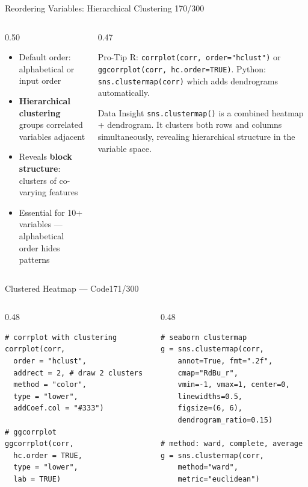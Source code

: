 \documentclass[10pt]{beamer}
\newcommand{\smark}[1]{\hfill{\scriptsize\color{codegray}#1}}
\begin{document}
\begin{frame}{Reordering Variables: Hierarchical Clustering}
\smark{170/300}
\begin{columns}[T]
\begin{column}{0.50\textwidth}
\begin{itemize}
    \item Default order: alphabetical or input order
    \item \textbf{Hierarchical clustering} groups correlated variables adjacent
    \item Reveals \textbf{block structure}: clusters of co-varying features
    \item Essential for 10+ variables --- alphabetical order hides patterns
\end{itemize}
\end{column}
\begin{column}{0.47\textwidth}
\begin{alertblock}{Pro-Tip}
    \scriptsize R: \texttt{corrplot(corr, order="hclust")} or \texttt{ggcorrplot(corr, hc.order=TRUE)}. Python: \texttt{sns.clustermap(corr)} which adds dendrograms automatically.
\end{alertblock}
\vspace{0.2cm}
\begin{exampleblock}{Data Insight}
    \scriptsize \texttt{sns.clustermap()} is a combined heatmap + dendrogram. It clusters both rows and columns simultaneously, revealing hierarchical structure in the variable space.
\end{exampleblock}
\end{column}
\end{columns}
\end{frame}

\begin{frame}[fragile]{Clustered Heatmap --- Code}\smark{171/300}
\begin{columns}[T]
\begin{column}{0.48\textwidth}
\begin{lstlisting}[style=Rstyle]
# corrplot with clustering
corrplot(corr,
  order = "hclust",
  addrect = 2, # draw 2 clusters
  method = "color",
  type = "lower",
  addCoef.col = "#333")

# ggcorrplot
ggcorrplot(corr,
  hc.order = TRUE,
  type = "lower",
  lab = TRUE)
\end{lstlisting}
\end{column}
\begin{column}{0.48\textwidth}
\begin{lstlisting}[style=Pystyle]
# seaborn clustermap
g = sns.clustermap(corr,
    annot=True, fmt=".2f",
    cmap="RdBu_r",
    vmin=-1, vmax=1, center=0,
    linewidths=0.5,
    figsize=(6, 6),
    dendrogram_ratio=0.15)

# method: ward, complete, average
g = sns.clustermap(corr,
    method="ward",
    metric="euclidean")
\end{lstlisting}
\end{column}
\end{columns}
\end{frame}
\end{document}
